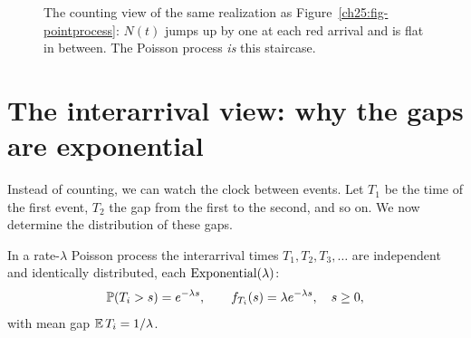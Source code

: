 \begin{figure}[H]
\centering
{}
\caption{The counting view of the same realization as
Figure~\ref{ch25:fig-pointprocess}: $N(t)$ jumps up by one at each red arrival
and is flat in between. The Poisson process \emph{is} this staircase.}
\label{ch25:fig-staircase}
\end{figure}

\section{The interarrival view: why the gaps are exponential}
\label{ch25:interarrival}

Instead of counting, we can watch the clock between events. Let $T_1$ be the time of the first event, $T_2$ the gap from the first to the second, and so on. We now determine the distribution of these gaps.

\begin{theorem}
\label{ch25:thm-exponential}
In a rate-$\lambda$ Poisson process the interarrival times
$T_1, T_2, T_3, \dots$ are independent and identically distributed, each
$\Expo(\lambda)$:
\[
\P(T_i > s) = e^{-\lambda s}, \qquad f_{T_i}(s) = \lambda e^{-\lambda s},
\quad s \ge 0,
\]
with mean gap $\E T_i = 1/\lambda$.
\end{theorem}

